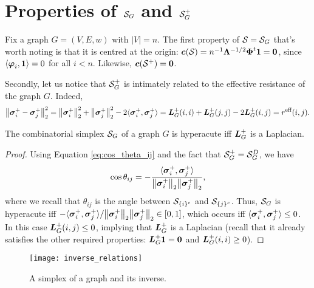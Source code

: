  



\section{Properties of \texorpdfstring{$\mathcal{S}_G$}{the Combinatorial Simplex} and \texorpdfstring{$\mathcal{S}_G^+$}{its inverse}}
\label{sec:S_G}
Fix a graph $G=(V,E,w)$ with $|V|=n$. The first property of $\mathcal{S}=\mathcal{S}_G$ that's worth noting is that it is centred at the origin: $\vb*{c}(\mathcal{S}) = n^{-1}\vb{\Lambda}^{-1/2}\boldsymbol{\Phi}^t \vb{1} =\vb{0}$, since $\langle \vb*{\varphi}_i,\vb{1}\rangle =0$ for all $i<n$.  Likewise, $\vb*{c}(\mathcal{S}^+)=\vb{0}$. 


Secondly, let us notice that $\mathcal{S}_G^+$ is intimately related to the effective resistance of the graph $G$. Indeed, 
\begin{equation*}
\norm{\vb*{\sigma}_i^+-\vb*{\sigma}_j^+}_2^2 = \norm{\vb*{\sigma}_i^+}_2^2 + \norm{\vb*{\sigma}_j^+}_2^2 - 2\langle \vb*{\sigma}_i^+,\vb*{\sigma}_j^+\rangle = \vb*{L}_G^+(i,i) + \vb*{L}_G^+(j,j) - 2\vb*{L}_G^+(i,j) = r^{\text{eff}}(i,j).
\end{equation*}

\begin{lemma}
	The combinatorial simplex $\mathcal{S}_G$ of a graph $G$ is hyperacute iff $\vb*{L}_G^+$ is a Laplacian.
\end{lemma}
\begin{proof}
	Using Equation \ref{eq:cos_theta_ij} and the fact that $\mathcal{S}_G^+=\mathcal{S}_G^D$, we have
	\[\cos \theta_{ij} = -\frac{\langle \vb*{\sigma}_i^+,\vb*{\sigma}_j^+\rangle }{\norm{\vb*{\sigma}_i^+}_2 \norm{\vb*{\sigma}_j^+}_2},\]
	where we recall that $\theta_{ij}$ is the angle between $\mathcal{S}_{\{i\}^c}$ and $\mathcal{S}_{\{j\}^c}$. Thus, $\mathcal{S}_G$ is hyperacute iff $-\langle \vb*{\sigma}_i^+,\vb*{\sigma}_j^+\rangle\\/\norm{\vb*{\sigma}_i^+}_2 \norm{\vb*{\sigma}_j^+}_2 \in[0,1]$, which occurs iff $\langle \vb*{\sigma}_i^+,\vb*{\sigma}_j^+\rangle \leq 0$. In this case $\vb*{L}_G^+(i,j)\leq 0$, implying that $\vb*{L}_G^+$ is a Laplacian (recall that it already satisfies the other required properties: $\vb*{L}_G^+\vb{1}=\vb{0}$ and $\vb*{L}_G^+(i,i)\geq 0$). 
\end{proof}



\begin{figure}
	\centering
	\texttt{[image: inverse\_relations]}
	\caption{A simplex of a graph and its inverse. }
	\label{fig:inverse_relations}
\end{figure}

